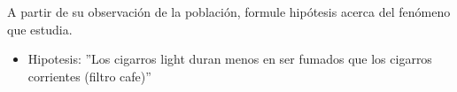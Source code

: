 A partir de su observaci\'on de la poblaci\'on, formule hip\'otesis acerca del fen\'omeno que estudia.

\begin{itemize}
	\item Hipotesis: ''Los cigarros light duran menos en ser fumados que los cigarros corrientes (filtro cafe)''
\end{itemize}
